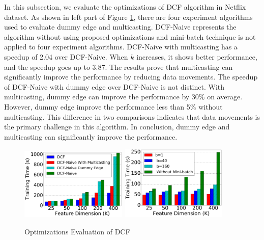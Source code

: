 \documentclass{llncs}
\begin{document}
In this subsection, we evaluate the optimizations of DCF algorithm in Netflix dataset. As shown in left part of Figure \ref{fig:opt}, there are four experiment algorithms used to evaluate dummy edge and multicasting. DCF-Naive represents the algorithm without using proposed optimizations and mini-batch technique is not applied to four experiment algorithms. DCF-Naive with multicasting has a speedup of 2.04 over DCF-Naive. When $k$ increases, it shows better performance, and the speedup goes up to 3.87. The results prove that multicasting can significantly improve the performance by reducing data movements. The speedup of DCF-Naive with dummy edge over DCF-Naive is not distinct. With multicasting, dummy edge can improve the performance by 30\% on average. However, dummy edge improve the performance less than 5\% without multicasting. This difference in two comparisons indicates that data movements is the primary challenge in this algorithm. In conclusion, dummy edge and multicasting can significantly improve the performance.


\begin{figure}[!t]
\centering
\includegraphics[width=2in]{pics/opt.pdf}
\includegraphics[width=2in]{pics/mb.pdf}
\vspace{-10pt}
\caption{Optimizations Evaluation of DCF}
\label{fig:opt}
\end{figure}

\end{document}
